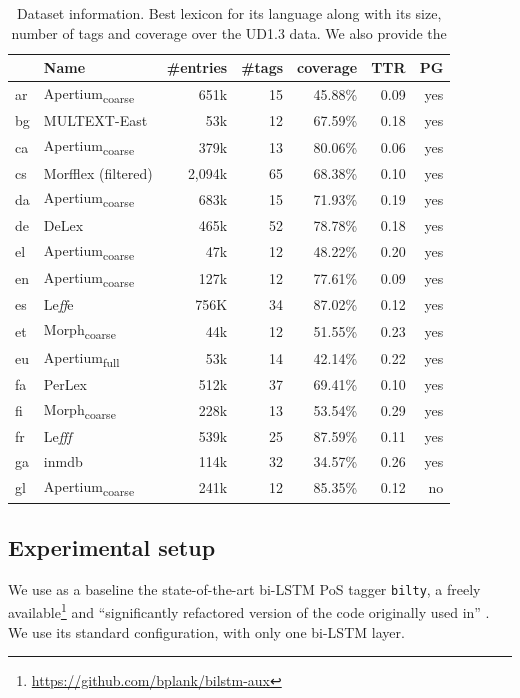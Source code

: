 \documentclass[11pt,letterpaper]{article}
\begin{document}
\begin{table}
\centering
\scriptsize
\begin{tabular}{llrrr|rr}
\toprule
 & Name & \#entries & \#tags  & coverage & TTR & PG \\
\midrule 
ar &   Apertium\textsubscript{coarse} & 651k & 15 & 45.88\% &0.09& yes \\
bg & MULTEXT-East & 53k &12 & 67.59\% & 0.18 & yes \\
ca &  Apertium\textsubscript{coarse} & 379k & 13 & 80.06\% & 0.06 & yes \\
cs & Morfflex (filtered)  & 2,094k & 65 & 68.38\% & 0.10 & yes \\
da & Apertium\textsubscript{coarse} & 683k & 15 & 71.93\% & 0.19 & yes \\
de & DeLex & 465k & 52 & 78.78\% & 0.18 &yes\\
el & Apertium\textsubscript{coarse} & 47k & 12 & 48.22\% & 0.20 & yes \\
en & Apertium\textsubscript{coarse} & 127k & 12 & 77.61\% & 0.09& yes \\
es & Le{\it ff}e &  756K & 34 & 87.02\% & 0.12 &yes\\
et & Morph\textsubscript{coarse} & 44k & 12 & 51.55\% & 0.23 & yes \\
eu & Apertium\textsubscript{full} & 53k &  14 & 42.14\% & 0.22 &  yes \\
fa  & PerLex &  512k & 37 & 69.41\% & 0.10 & yes\\
fi & Morph\textsubscript{coarse} & 228k & 13 & 53.54\% & 0.29 & yes \\
fr & Le{\it fff} & 539k & 25 & 87.59\% &0.11 &yes\\
ga & inmdb & 114k & 32 & 34.57\% & 0.26& yes\\
gl & Apertium\textsubscript{coarse} & 241k & 12 & 85.35\%  & 0.12 &no\\
\bottomrule
\end{tabular}
\caption{Dataset information. Best lexicon for its language along with its size, number of tags and coverage over the UD1.3 data. We also provide the}\label{tbl:lex}
\end{table}

\subsection{Experimental setup}

We use as a baseline the state-of-the-art bi-LSTM PoS tagger \texttt{bilty}, a freely
available\footnote{\url{https://github.com/bplank/bilstm-aux}} and ``significantly refactored version of the code
originally used in'' \cite{plank16}. We use its standard configuration, with only one bi-LSTM layer.
\end{document}
